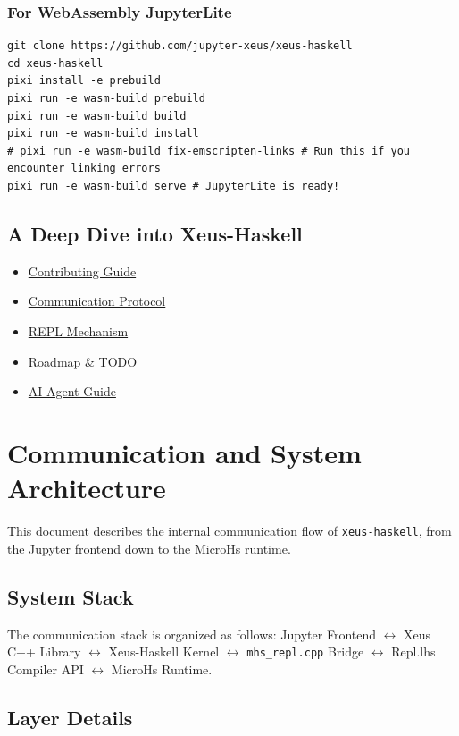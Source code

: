 \documentclass[11pt]{article}
\begin{document}
\subsubsection{For WebAssembly JupyterLite}


\begin{verbatim}
git clone https://github.com/jupyter-xeus/xeus-haskell
cd xeus-haskell
pixi install -e prebuild
pixi run -e wasm-build prebuild
pixi run -e wasm-build build
pixi run -e wasm-build install
# pixi run -e wasm-build fix-emscripten-links # Run this if you encounter linking errors
pixi run -e wasm-build serve # JupyterLite is ready!
\end{verbatim}


\subsection{A Deep Dive into Xeus-Haskell}


\begin{itemize}
\item \hyperref[sec:contributing]{Contributing Guide}
\item \hyperref[sec:communication]{Communication Protocol}
\item \hyperref[sec:repl]{REPL Mechanism}
\item \hyperref[sec:todo]{Roadmap \& TODO}
\item \href{https://github.com/jupyter-xeus/xeus-haskell/blob/main/AGENTS.md}{AI Agent Guide}
\end{itemize}

\section{Communication and System Architecture}
\label{sec:communication}


This document describes the internal communication flow of \texttt{xeus-haskell}, from the Jupyter frontend down to the MicroHs runtime.
\subsection{System Stack}


The communication stack is organized as follows:
Jupyter Frontend \(\leftrightarrow\) Xeus C++ Library \(\leftrightarrow\) Xeus-Haskell Kernel \(\leftrightarrow\) \texttt{mhs\_repl.cpp} Bridge \(\leftrightarrow\) Repl.lhs Compiler API \(\leftrightarrow\) MicroHs Runtime.


\subsection{Layer Details}
\end{document}
